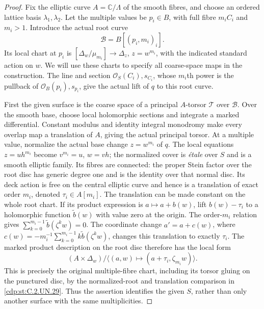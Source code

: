\begin{proof}
Fix the elliptic curve $A=\mathbb C/\Lambda$ of
the smooth fibres, and choose an ordered lattice
basis $\lambda_1,\lambda_2$. Let the multiple
values be $p_i\in B$, with full fibre
$m_iC_i$ and $m_i>1$. Introduce the actual root
curve
\[
                 \mathcal B=B[(p_i,m_i)_i].
                                                               \tag{C.SF.1}\label{cdp:eq:C.SF.1}
\]
Its local chart at $p_i$ is
$[\Delta_w/\mu_{m_i}]\to\Delta_z$,
$z=w^{m_i}$, with the indicated standard action
on $w$. We will use these charts to specify
all coarse-space maps in the construction.
The line and section $\mathcal O_S(C_i),s_{C_i}$,
whose $m_i$th power is the pullback of
$\mathcal O_B(p_i),s_{p_i}$, give the actual
lift of $q$ to this root curve.

First the given surface is the coarse space
of a principal $A$-torsor $\mathcal T$ over
$\mathcal B$. Over the smooth base, choose
local holomorphic sections and integrate a
marked differential. Constant modulus and
identity integral monodromy make every
overlap map a translation of $A$, giving
the actual principal torsor. At a multiple
value, normalize the actual base change
$z=w^{m_i}$ of $q$. The local equations
$z=u h^{m_i}$ become $v^{m_i}=u$, $w=vh$;
the normalized cover is \emph{\'etale} over
$S$ and is a smooth elliptic family. Its
fibres are connected: the proper Stein
factor over the root disc has generic
degree one and is the identity over
that normal disc. Its
deck action is free on the central elliptic
curve and hence is a translation of exact
order $m_i$, denoted $\tau_i\in A[m_i]$.
The translation can be made constant
on the whole root chart. If its product
expression is $a\mapsto a+b(w)$, lift
$b(w)-\tau_i$ to a holomorphic function
$\widetilde b(w)$ with value zero at
the origin. The order-$m_i$ relation
gives $\sum_{k=0}^{m_i-1}\widetilde b(\zeta^kw)=0$.
The coordinate change $a'=a+c(w)$, where
$c(w)=-m_i^{-1}\sum_{k=0}^{m_i-1}
 k\widetilde b(\zeta^kw)$, changes this
translation to exactly $\tau_i$.
The marked product description on the root
disc therefore has the local form
\[
 (A\times\Delta_w)/
 \langle(a,w)\mapsto(a+\tau_i,\zeta_{m_i}w)\rangle.
                                                               \tag{C.SF.2}\label{cdp:eq:C.SF.2}
\]
This is precisely the original multiple-fibre
chart, including its torsor gluing on the
punctured disc, by the normalized-root and
translation comparison in \ref{cdp:st:C.2.UN.29}.
Thus the assertion identifies the given
$S$, rather than only another surface with
the same multiplicities.


\end{proof}
